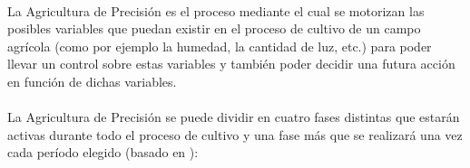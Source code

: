 \documentclass[../../memoria.tex]{subfiles}
\begin{document}
\paragraph{}
La Agricultura de Precisión es el proceso mediante el cual se motorizan las posibles variables que puedan existir en el proceso de cultivo de un campo agrícola (como por ejemplo la humedad, la cantidad de luz, etc.) para poder llevar un control sobre estas variables y también poder decidir una futura acción en función de dichas variables.

\paragraph{}
La Agricultura de Precisión se puede dividir en cuatro fases distintas que estarán activas durante todo el proceso de cultivo y una fase más que se realizará una vez cada período elegido (basado en \cite{qampo}):
\end{document}
